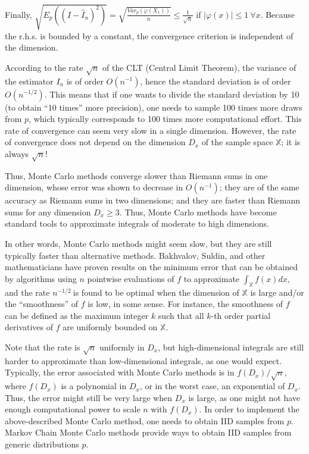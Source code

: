 Finally,
\(\sqrt{E_{p}\left( \left( I - {\widehat{I}}_{n} \right)^{2} \right)} = \sqrt{\frac{Var_{p}\left( \varphi\left( X_{1} \right) \right)}{n}} \leq \frac{1}{\sqrt{n}}\)
if \(\left| \varphi(x) \right| \leq 1\ \forall x\). Because the r.h.s.
is bounded by a constant, the convergence criterion is independent of
the dimension.

According to the rate \(\sqrt{n}\) of the CLT (Central Limit Theorem),
the variance of the estimator \(I_{n}\) is of order
\(O\left( n^{- 1} \right)\), hence the standard deviation is of order
\(O\left( n^{- 1/2} \right)\). This means that if one wants to divide
the standard deviation by 10 (to obtain ``10 times'' more precision),
one needs to sample 100 times more draws from \(p\), which typically
corresponds to 100 times more computational effort. This rate of
convergence can seem very slow in a single dimension. However, the rate
of convergence does not depend on the dimension \(D_{x}\) of the sample
space \(\mathbb{X}\); it is always \(\sqrt{n}\)!

Thus, Monte Carlo methods converge slower than Riemann sums in one
dimension, whose error was shown to decrease in \(O(n^{- 1})\); they are
of the same accuracy as Riemann sums in two dimensions; and they are
faster than Riemann sums for any dimension \(D_{x} \geq 3\). Thus, Monte
Carlo methods have become standard tools to approximate integrals of
moderate to high dimensions.

In other words, Monte Carlo methods might seem slow, but they are still
typically faster than alternative methods. Bakhvalov, Suldin, and other
mathematicians have proven results on the minimum error that can be
obtained by algorithms using \(n\) pointwise evaluations of \(f\) to
approximate \(\int_{\mathbb{X}}^{}{f(x)}dx\), and the rate
\(n^{- 1/2}\ \)is found to be optimal when the dimension of
\(\mathbb{X}\) is large and/or the ``smoothness'' of \(f\) is low, in
some sense. For instance, the smoothness of \(f\) can be defined as the
maximum integer \(k\) such that all \(k\)-th order partial derivatives
of \(f\) are uniformly bounded on \(\mathbb{X}\).

Note that the rate is \(\sqrt{n}\) uniformly in \(D_{x}\), but
high-dimensional integrals are still harder to approximate than
low-dimensional integrals, as one would expect. Typically, the error
associated with Monte Carlo methods is in \(f(D_{x})/\sqrt{n}\), where
\(f(D_{x})\) is a polynomial in \(D_{x}\), or in the worst case, an
exponential of \(D_{x}\). Thus, the error might still be very large when
\(D_{x}\) is large, as one might not have enough computational power to
scale \(n\) with \(f(D_{x})\). In order to implement the above-described
Monte Carlo method, one needs to obtain IID samples from \(p\). Markov
Chain Monte Carlo methods provide ways to obtain IID samples from
generic distributions \(p\).


